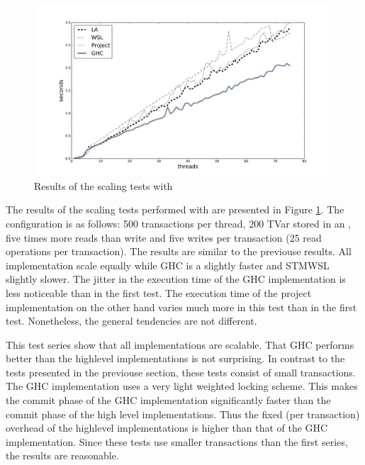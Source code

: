 \begin{figure}
 \centering
 \includegraphics[scale=0.35]{Figures/Scaling2}
\caption[Runtime: Scaling Test II]{Results of the scaling tests with }
\label{fig:scaling2}
\end{figure}

The results of the scaling tests performed with  are presented in Figure \ref{fig:scaling2}. The configuration 
is as follows: 500 transactions per thread, 200 TVar stored in an , five times more reads than write and
five writes per transaction (25 read operations per transaction). The results are similar to the previouse results. All implementation scale equally while
GHC is a slightly faster and STMWSL slightly slower. The jitter in the execution time of the GHC implementation is less noticeable than 
in the first test. The execution time of the project implementation on the other hand varies much more in this test than
in the first test. Nonetheless, the general tendencies are not different. 

This test series show that all implementations are scalable. That GHC performs better than the highlevel implementations
is not surprising. In contrast to the tests presented in the previouse section, these tests consist of small transactions.
The GHC implementation uses a very light weighted locking scheme. This makes the commit phase of the GHC implementation
significantly faster than the commit phase of the high level implementations. Thus the fixed (per transaction) overhead
of the highlevel implementations is higher than that of the GHC implementation. Since these tests use smaller transactions
than the first series, the results are reasonable.

